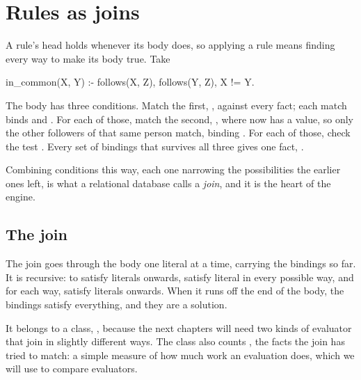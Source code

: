 \chapter{Rules as joins}\label{ch:joins}

A rule's head holds whenever its body does, so applying a rule means
finding every way to make its body true. Take

\begin{shell}
in_common(X, Y) :- follows(X, Z), follows(Y, Z), X != Y.
\end{shell}

The body has three conditions. Match the first, , against
every  fact; each match binds  and . For each
of those, match the second, , where  now has a
value, so only the other followers of that same person match, binding
. For each of those, check the test . Every set of
bindings that survives all three gives one fact, .

Combining conditions this way, each one narrowing the possibilities the
earlier ones left, is what a relational database calls a \emph{join}, and
it is the heart of the engine.

\section{The join}

The join goes through the body one literal at a time, carrying the
bindings so far. It is recursive: to satisfy literals  onwards,
satisfy literal  in every possible way, and for each way, satisfy
literals  onwards. When it runs off the end of the body, the
bindings satisfy everything, and they are a solution.

It belongs to a class, , because the next chapters will need
two kinds of evaluator that join in slightly different ways. The class also
counts , the facts the join has tried to match: a simple
measure of how much work an evaluation does, which we will use to compare
evaluators.

